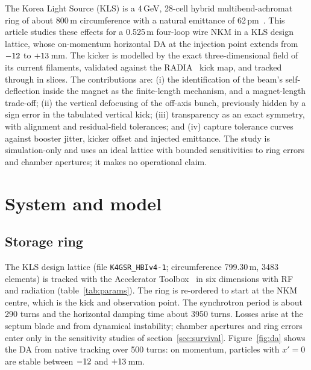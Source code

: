 \documentclass[a4paper,11pt]{article}
\begin{document}
The Korea Light Source (KLS) is a 4\,GeV, 28-cell hybrid multibend-achromat ring of about 800\,m circumference with a natural emittance of 62\,pm~\cite{Kim2025}. This article studies these effects for a 0.525\,m four-loop wire NKM in a KLS design lattice, whose on-momentum horizontal DA at the injection point extends from $-12$ to $+13$\,mm. The kicker is modelled by the exact three-dimensional field of its current filaments, validated against the RADIA~\cite{Chubar1998} kick map, and tracked through in slices. The contributions are: (i) the identification of the beam's self-deflection inside the magnet as the finite-length mechanism, and a magnet-length trade-off; (ii) the vertical defocusing of the off-axis bunch, previously hidden by a sign error in the tabulated vertical kick; (iii) transparency as an exact symmetry, with alignment and residual-field tolerances; and (iv) capture tolerance curves against booster jitter, kicker offset and injected emittance. The study is simulation-only and uses an ideal lattice with bounded sensitivities to ring errors and chamber apertures; it makes no operational claim.

\section{System and model}
\label{sec:model}

\subsection{Storage ring}

The KLS design lattice (file \texttt{K4GSR\_HBIv4-1}; circumference 799.30\,m, 3483 elements) is tracked with the Accelerator Toolbox~\cite{Terebilo2001,Rogers2017} in six dimensions with RF and radiation (table~\ref{tab:params}). The ring is re-ordered to start at the NKM centre, which is the kick and observation point. The synchrotron period is about 290 turns and the horizontal damping time about 3950 turns. Losses arise at the septum blade and from dynamical instability; chamber apertures and ring errors enter only in the sensitivity studies of section~\ref{sec:survival}. Figure~\ref{fig:da} shows the DA from native tracking over 500 turns: on momentum, particles with $x'=0$ are stable between $-12$ and $+13$\,mm.
\end{document}
